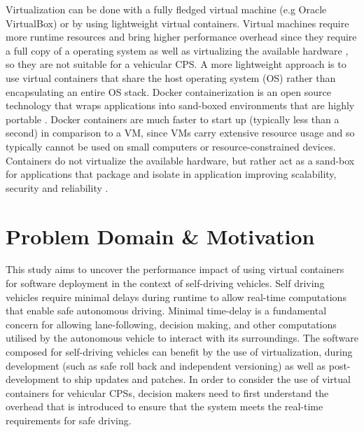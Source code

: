 
Virtualization can be done with a fully fledged virtual machine (e.g Oracle VirtualBox) or by using lightweight virtual containers. Virtual machines require more runtime resources and bring higher performance overhead since they require a full copy of a operating system as well as virtualizing the available hardware \cite{anderson2015docker}, so they are not suitable for a vehicular CPS. A more lightweight approach is to use virtual containers that share the host operating system (OS) rather than encapsulating an entire OS stack. Docker containerization is an open source technology that wraps applications into sand-boxed environments that are highly portable \cite{anderson2015docker}. Docker containers are much faster to start up (typically less than a second) in comparison to a VM, since VMs carry extensive resource usage and so typically cannot be used on small computers or resource-constrained devices. Containers do not virtualize the available hardware, but rather act as a sand-box for applications that package and isolate in application improving scalability, security and reliability \cite{gonz}. 




\section{Problem Domain \& Motivation}
This study aims to uncover the performance impact of using virtual containers for software deployment in the context of self-driving vehicles. Self driving vehicles require minimal delays during runtime to allow real-time computations that enable safe autonomous driving. Minimal time-delay is a fundamental concern for allowing lane-following, decision making, and other computations utilised by the autonomous vehicle to interact with its surroundings. The software composed for self-driving vehicles can benefit by the use of virtualization, during development (such as safe roll back and independent versioning) as well as post-development to ship updates and patches. In order to consider the use of virtual containers for vehicular CPSs, decision makers need to first understand the overhead that is introduced to ensure that the system meets the real-time requirements for safe driving.\\

